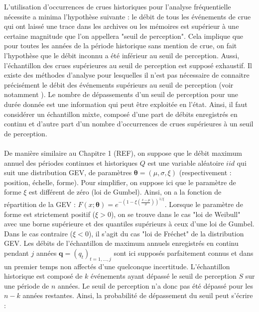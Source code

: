 \documentclass[11pt]{article}
\begin{document}
		L'utilisation d'occurrences de crues historiques pour l'analyse fréquentielle nécessite a minima l'hypothèse suivante : le débit de tous les événements de crue qui ont laissé une trace dans les archives ou les mémoires est supérieur à une certaine magnitude que l'on appellera "seuil de perception". Cela implique que pour toutes les années de la période historique sans mention de crue, on fait l'hypothèse que le débit inconnu a été inférieur au seuil de perception. Aussi, l'échantillon des crues supérieures au seuil de perception est supposé exhaustif. Il existe des méthodes d'analyse pour lesquelles il n'est pas nécessaire de connaitre précisément le débit des événements supérieurs au seuil de perception (voir notamment \citet{stedinger_flood_1986}). Le nombre de dépassements d'un seuil de perception pour une durée donnée est une information qui peut être exploitée en l'état. Ainsi, il faut considérer un échantillon mixte, composé d'une part de débits enregistrés en continu et d'autre part d'un nombre d'occurrences de crues supérieures à un seuil de perception. 
			
		\paragraph{}
		De manière similaire au Chapitre 1 (REF), on suppose que le débit maximum annuel des périodes continues et historiques $Q$ est une variable aléatoire $iid$ qui suit une distribution GEV, de paramètres $\boldsymbol{\theta} = (\mu,\sigma,\xi)$ (respectivement : position, échelle, forme). Pour simplifier, on suppose ici que le paramètre de forme $\xi$ est différent de zéro (loi de Gumbel). Ainsi, on a la fonction de répartition de la GEV : $F(x;\boldsymbol{\theta}) = e^{-(1-\xi(\frac{x - \mu}{\sigma}))^{1/\xi}}$. Lorsque le paramètre de forme est strictement positif ($\xi > 0$), on se trouve dans le cas "loi de Weibull" avec une borne supérieure et des quantiles supérieurs à ceux d'une loi de Gumbel. Dans le cas contraire ($\xi < 0$), il s'agit du cas "loi de Fréchet" de la distribution GEV. Les débits de l'échantillon de maximum annuels enregistrés en continu pendant $j$ années $\boldsymbol{q}= (q_t)_{t=1,...,j}$ sont ici supposés parfaitement connus et dans un premier temps non affectés d'une quelconque incertitude. L'échantillon historique est composé de $k$ événements ayant dépassé le seuil de perception $S$ sur une période de $n$ années. Le seuil de perception n'a donc pas été dépassé pour les $n-k$ années restantes. Ainsi, la probabilité de dépassement du seuil peut s'écrire :
		
\end{document}
